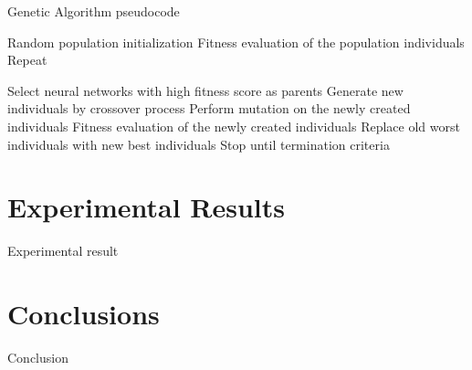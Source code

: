 \documentclass{svproc}
\newlength\myindent
\newcommand\bindent{%
  \begingroup
  \setlength{\itemindent}{\myindent}
  \addtolength{\algorithmicindent}{\myindent}
}
\newcommand\eindent{\endgroup}
\begin{document}
\begin{algorithm}
  \caption{Genetic Algorithm pseudocode \cite{zouita2019improving}}
  \label{alg:ga_pseudo}
  \begin{algorithmic}[1]
    \STATE Random population initialization  \label{op0}
    \STATE Fitness evaluation of the population individuals \label{op1}
    \STATE Repeat \label{op2}
    \bindent
    \STATE Select neural networks with high fitness score as parents 
    \STATE Generate new individuals by crossover process
    \STATE Perform mutation on the newly created individuals
    \STATE Fitness evaluation of the newly created individuals
    \STATE Replace old worst individuals with new best individuals
    \eindent
    \STATE Stop until termination criteria     
  \end{algorithmic}
\end{algorithm}


\section{Experimental Results}
Experimental result

\section{Conclusions}
Conclusion
%
%
\end{document}
